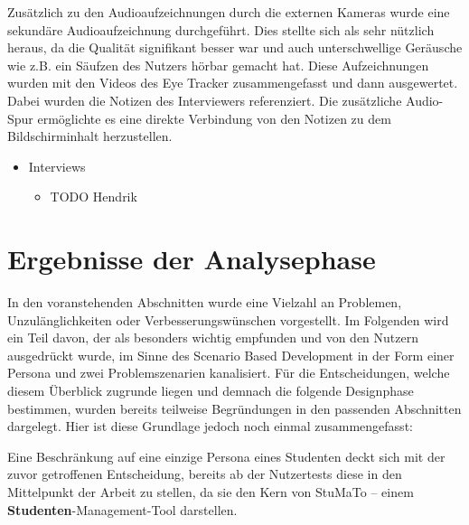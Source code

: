 \documentclass[
  12pt,
  ngerman,
  a4paper,
]{article}
\providecommand{\tightlist}{%
  \setlength{\itemsep}{0pt}\setlength{\parskip}{0pt}}
\begin{document}
Zusätzlich zu den Audioaufzeichnungen durch die externen Kameras wurde
eine sekundäre Audioaufzeichnung durchgeführt. Dies stellte sich als
sehr nützlich heraus, da die Qualität signifikant besser war und auch
unterschwellige Geräusche wie z.B. ein Säufzen des Nutzers hörbar
gemacht hat. Diese Aufzeichnungen wurden mit den Videos des Eye Tracker
zusammengefasst und dann ausgewertet. Dabei wurden die Notizen des
Interviewers referenziert. Die zusätzliche Audio-Spur ermöglichte es
eine direkte Verbindung von den Notizen zu dem Bildschirminhalt
herzustellen.

\begin{itemize}
\tightlist
\item
  Interviews

  \begin{itemize}
  \tightlist
  \item
    TODO Hendrik
  \end{itemize}
\end{itemize}

\hypertarget{ergebnisse-der-analysephase}{%
\section{Ergebnisse der
Analysephase}\label{ergebnisse-der-analysephase}}

In den voranstehenden Abschnitten wurde eine Vielzahl an Problemen,
Unzulänglichkeiten oder Verbesserungswünschen vorgestellt. Im Folgenden
wird ein Teil davon, der als besonders wichtig empfunden und von den
Nutzern ausgedrückt wurde, im Sinne des Scenario Based Development in
der Form einer Persona und zwei Problemszenarien kanalisiert. Für die
Entscheidungen, welche diesem Überblick zugrunde liegen und demnach die
folgende Designphase bestimmen, wurden bereits teilweise Begründungen in
den passenden Abschnitten dargelegt. Hier ist diese Grundlage jedoch
noch einmal zusammengefasst:

Eine Beschränkung auf eine einzige Persona eines Studenten deckt sich
mit der zuvor getroffenen Entscheidung, bereits ab der Nutzertests diese
in den Mittelpunkt der Arbeit zu stellen, da sie den Kern von StuMaTo --
einem \textbf{Studenten}-Management-Tool darstellen.
\end{document}
